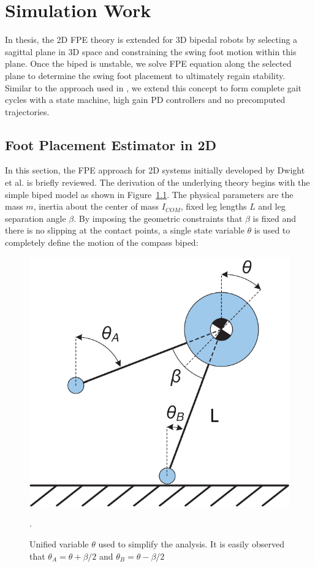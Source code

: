 \chapter{Simulation Work} %
\label{cha:simulations}
In thesis, the 2D FPE theory is extended for 3D bipedal robots by selecting a sagittal plane in 3D space and constraining the swing foot motion within this plane. Once the biped is unstable, we solve FPE equation along the selected plane to determine the swing foot placement to ultimately regain stability. Similar to the approach used in \cite{Wight:2008ii,Wight:2008vt}, we extend this concept to form complete gait cycles with a state machine, high gain PD controllers and no precomputed trajectories.

\section{Foot Placement Estimator in 2D} %
\label{sec:foot_placement_estimator_in_2d}
In this section, the FPE approach for 2D systems initially developed by Dwight et al. \cite{Wight:2008ii} is briefly reviewed. The derivation of the underlying theory begins with the simple biped model as shown in Figure~\ref{fig:unified}. The physical parameters are the mass $m$, inertia about the center of mass $I_{COM}$, fixed leg lengths $L$ and leg separation angle $\beta$. By imposing the geometric constraints that $\beta$ is fixed and there is no slipping at the contact points, a single state variable $\theta$ is used to completely define the motion of the compass biped:

\begin{figure}[!h]
	\centering
    \includegraphics[scale=0.7]{fig/ch4/compass.pdf}
  	\caption{Unified variable $\theta$ used to simplify the analysis. It is easily observed that $\theta_A = \theta  + \beta /2$ and $\theta_B = \theta  - \beta /2$}.
	\label{fig:unified}
\end{figure}

